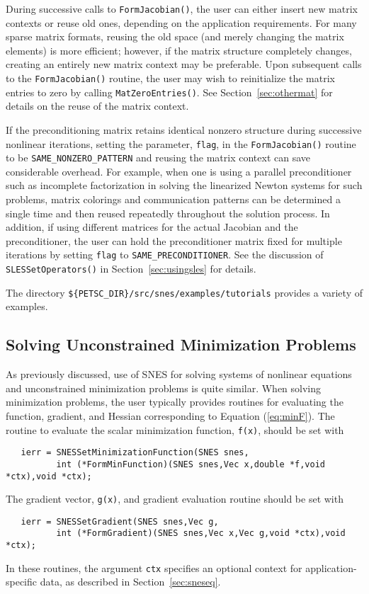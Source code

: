 During successive calls to {\tt FormJacobian()}, the user can either
insert new matrix contexts or reuse old ones, depending on the
application requirements. For many sparse matrix formats, reusing the
old space (and merely changing the matrix elements) is more efficient;
however, if the matrix structure completely changes, creating an
entirely new matrix context may be preferable.  
Upon subsequent calls to the 
{\tt FormJacobian()} routine, the user may wish to reinitialize the matrix
entries to zero by calling {\tt MatZeroEntries()}.  See
Section~\ref{sec:othermat} for details on the reuse of the matrix
context.

If the preconditioning matrix retains identical nonzero structure
during successive nonlinear iterations, setting the parameter, {\tt flag},
in the {\tt FormJacobian()} routine to be {\tt SAME\_NONZERO\_PATTERN} 
 and reusing the matrix context can save
considerable overhead.  For example, when one is using a parallel
preconditioner such as incomplete factorization in solving the
linearized Newton systems for such problems, matrix colorings and
communication patterns can be determined a single time and then reused
repeatedly throughout the solution process.  In addition, if using
different matrices for the actual Jacobian and the preconditioner, the
user can hold the preconditioner matrix fixed for multiple iterations
by setting {\tt flag} to {\tt SAME\_PRECONDITIONER}.  See the
discussion of {\tt SLESSetOperators()} in Section~\ref{sec:usingsles} for
details.

The directory {\tt \$\{PETSC\_DIR\}/src/snes/examples/tutorials} provides
a variety of examples.

\subsection{Solving Unconstrained Minimization Problems}
\label{sec:sums}

As previously discussed, use of SNES for solving systems of
nonlinear equations and unconstrained minimization problems is quite
similar.  When solving minimization problems, the user typically
provides routines for evaluating the function, gradient, and Hessian
corresponding to Equation (\ref{eq:minF}).  The routine to evaluate
the scalar minimization function, {\tt f(x)}, should be set with
\begin{verbatim}
   ierr = SNESSetMinimizationFunction(SNES snes,
          int (*FormMinFunction)(SNES snes,Vec x,double *f,void *ctx),void *ctx);
\end{verbatim}
The gradient vector, {\tt g(x)}, and gradient evaluation routine should
be set with 
\begin{verbatim}
   ierr = SNESSetGradient(SNES snes,Vec g,
          int (*FormGradient)(SNES snes,Vec x,Vec g,void *ctx),void *ctx);
\end{verbatim}
In these routines, the argument {\tt ctx} specifies an 
optional context for application-specific data, as described in 
Section~\ref{sec:sneseq}.

